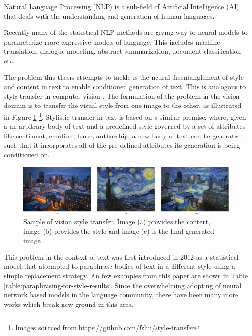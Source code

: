 Natural Language Processing (NLP) is a sub-field of Artificial Intelligence (AI) that deals with the understanding and generation of human languages.

Recently many of the statistical NLP methods are giving way to neural models to parameterize more expressive models of language. This includes machine translation, dialogue modeling, abstract summarization, document classification etc.

The problem this thesis attempts to tackle is the neural disentanglement of style and content in text to enable conditioned generation of text. This is analogous to style transfer in computer vision \citep{gatys2016image}. The formulation of the problem in the vision domain is to transfer the visual style from one image to the other, as illustrated in Figure \ref{fig:style-transfer-vision} \footnote{Images sourced from \url{https://github.com/fzliu/style-transfer}}. Stylistic transfer in text is based on a similar premise, where, given a an arbitrary body of text and a predefined style governed by a set of attributes like sentiment, emotion, tense, authorship, a new body of text can be generated such that it incorporates all of the pre-defined attributes its generation is being conditioned on.

\begin{figure}[ht]
	\centering
	\includegraphics[width=.8\textwidth]{images/style-transfer-vision.png}
	\caption{\label{fig:style-transfer-vision}Sample of vision style transfer. Image (a) provides the content, image (b) provides the style and image (c) is the final generated image}
\end{figure}

This problem in the context of text was first introduced in 2012 \citep{xu2012paraphrasing} as a statistical model that attempted to paraphrase bodies of text in a different style using a simple replacement strategy. An few examples from this paper are shown in Table \ref{table:paraphrasing-for-style-results}. Since the overwhelming adopting of neural network based models in the language community, there have been many more works which break new ground in this area.

